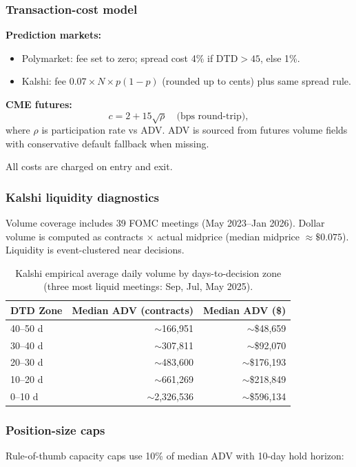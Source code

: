 \subsubsection*{Transaction-cost model}
\textbf{Prediction markets:}
\begin{itemize}
    \item Polymarket: fee set to zero; spread cost 4\% if DTD$>45$, else 1\%.
    \item Kalshi: fee $0.07\times N\times p(1-p)$ (rounded up to cents) plus same spread rule.
\end{itemize}

\textbf{CME futures:}
\[
c = 2 + 15\sqrt{\rho}\quad \text{(bps round-trip)},
\]
where $\rho$ is participation rate vs ADV. ADV is sourced from futures volume
fields with conservative default fallback when missing.

All costs are charged on entry and exit.

\subsubsection*{Kalshi liquidity diagnostics}
Volume coverage includes 39 FOMC meetings (May 2023--Jan 2026). Dollar volume
is computed as contracts $\times$ actual midprice (median midprice
$\approx\$0.075$). Liquidity is event-clustered near decisions.

\begin{table}[h]
    \centering
    \caption{Kalshi empirical average daily volume by days-to-decision zone
             (three most liquid meetings: Sep, Jul, May 2025).}
    \label{tab:kalshi-adv}
    \begin{tabular}{lrr}
        \toprule
        \textbf{DTD Zone} &
        \textbf{Median ADV (contracts)} &
        \textbf{Median ADV (\$)} \\
        \midrule
        40--50 d & $\sim$166,951   & $\sim$\$48,659  \\
        30--40 d & $\sim$307,811   & $\sim$\$92,070  \\
        20--30 d & $\sim$483,600   & $\sim$\$176,193 \\
        10--20 d & $\sim$661,269   & $\sim$\$218,849 \\
         0--10 d & $\sim$2,326,536 & $\sim$\$596,134 \\
        \bottomrule
    \end{tabular}
\end{table}

\subsubsection*{Position-size caps}
Rule-of-thumb capacity caps use 10\% of median ADV with 10-day hold horizon:

